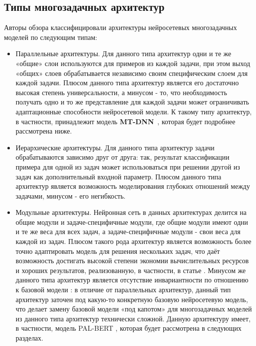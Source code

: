 \subsection{Типы многозадачных архитектур}
Авторы обзора \cite{chen_2021} классифицировали архитектуры нейросетевых многозадачных моделей по следующим типам:
\begin{itemize}
\item Параллельные архитектуры. Для данного типа архитектур одни и те же «общие» слои используются для примеров из каждой задачи, при этом выход «общих» слоев обрабатывается независимо своим специфическим слоем для каждой задачи. Плюсом данного типа архитектур является его достаточно высокая степень универсальности, а минусом - то, что необходимость получать одно и то же представление для каждой задачи может ограничивать адаптационные способности нейросетевой модели. К такому типу архитектур, в частности, принадлежит модель \textbf{MT-DNN}~\cite{mtdnn}, которая будет подробнее рассмотрена ниже. 
\item Иерархические архитектуры. Для данного типа архитектур задачи обрабатываются зависимо друг от друга: так, результат классификации примера для одной из задач может использоваться при решении другой из задач как дополнительный входной параметр. Плюсом данного типа архитектур является возможность моделирования глубоких отношений между задачами, минусом - его негибкость. 
\item Модульные архитектуры. Нейронная сеть в данных архитектурах делится на общие модули и задаче-специфичные модули, где общие модули имеют одни и те же веса для всех задач, а задаче-специфичные модули - свои веса для каждой из задач. Плюсом такого рода архитектур является возможность более точно адаптировать модель для решения нескольких задач, что даёт возможность достигать высокой степени экономии вычислительных ресурсов и хороших результатов, реализованную, в частности, в статье \cite{maziarka_2021}. Минусом же данного типа архитектур является отсутствие инвариантности по отношению к базовой модели : в отличие от параллельных архитектур, данный тип архитектур заточен под какую-то конкретную базовую нейросетевую модель, что делает замену базовой модели «под капотом» для многозадачных моделей из данного типа архитектур технически сложной. Данную архитектуру имеет, в частности, модель PAL-BERT \cite{stickland_2019}, которая будет рассмотрена в следующих разделах. 

\end{itemize}
